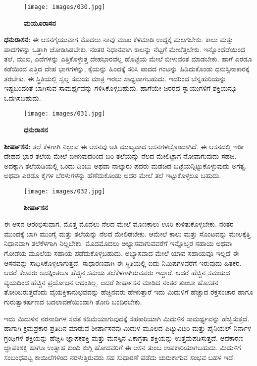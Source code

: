 \begin{figure}
\texttt{[image: images/030.jpg]}
\caption{ \textbf{ಮಯೂರಾಸನ} }
\end{figure}

\textbf{  ಧನುರಾಸನ:} ಈ ಆಸನಗೈಯುವಾಗ ಮೊದಲು ನಾವು ಮುಖ ಕೆಳಮಾಡಿ ಉದ್ದಕ್ಕೆ ಮಲಗಬೇಕು. ಕಾಲು ಮತ್ತು ಪಾದಗಳನ್ನು ಒತ್ತಾಗಿ ಜೋಡಿಸಿಡಬೇಕು. ನಂತರ ನಿಧಾನವಾಗಿ ಕಾಲನ್ನು ನೆಟ್ಟಗೆ ಮೇಲೆತ್ತಬೇಕು. ಇನ್ನೊಂದೆಡೆಯಿಂದ ತಲೆ, ಮುಖ, ಎದೆಗಳನ್ನು ಎತ್ತಿಕೊಳ್ಳುತ್ತ ದೇಹಭಾರವೆಲ್ಲ ಹೊಟ್ಟೆಯ ಮೇಲೆ ಬೀಳುವಂತೆ ಮಾಡಬೇಕು. ಹಾಗೆ ಎರಡೂ ಕಡೆಯಿಂದ ಎತ್ತಿದ ದೇಹ ಭಾಗಗಳನ್ನು, ಕೈಯನ್ನು ಹಿಂದಕ್ಕೆ ಸರಿಸಿ ಪಾದದ ಗಂಟನ್ನು ಹಿಡಿದುಕೊಂಡು ಧನುಸ್ಸಿನಾಕಾರಕ್ಕೆ ತರಬೇಕು. ಈ ಸ್ಥಿತಿಯಲ್ಲಿ ಸ್ವಲ್ಪ ಸಮಯ ಮಾತ್ರ ಇರಲು ಸಾಧ್ಯವಾಗಬಹುದು. ಇದರಿಂದ ಬೆನ್ನಹುರಿಯನ್ನು ಇಷ್ಟಬಂದಂತೆ ಬಾಗಿಸುವ ಸಾಮರ್ಥ್ಯವನ್ನು ಗಳಿಸಿಕೊಳ್ಳಬಹುದು. ಹಾಗೆಯೇ ಜಠರದ ಸ್ನಾಯುಗಳಿಗೆ ಶಕ್ತಿಯನ್ನೂ ಒದಗಿಸಬಹುದು.

\begin{figure}
\texttt{[image: images/031.jpg]}
\caption{ \textbf{ಧನುರಾಸನ} }
\end{figure}

\textbf{  ಶೀರ್ಷಾಸನ:} ತಲೆ ಕೆಳಗಾಗಿ ನಿಲ್ಲುವ ಈ ಆಸನವು ಅತಿ ಮುಖ್ಯವಾದ ಆಸನಗಳಲ್ಲೊಂದಾಗಿದೆ. ಈ ಆಸನದಲ್ಲಿ ಇಡೀ ದೇಹದ ಭಾರ ತಲೆಯ ಮೇಲೆ ಬೀಳುವುದರಿಂದ ಬರಿ ತಲೆಯನ್ನು ನೆಲದ ಮೇಲಿಟ್ಟಾಗ ನೋವಾಗುವುದು ಸಹಜ. ಅದಕ್ಕಾಗಿ ತಲೆಯಡಿಯಲ್ಲಿ ಒಂದು ದಿಂಬು ಅಥವಾ ನಾಲ್ಕಾರು ಪದರು ಮಡಚಿದ ಬಟ್ಟೆಯನ್ನಿಟ್ಟುಕೊಳ್ಳುವುದು ಅಗತ್ಯ. ಅಥವಾ ಎರಡೂ ಕೈಗಳ ಬೆರಳುಗಳನ್ನು ಹೆಣೆದುಕೊಂಡು ಅದರ ಮೇಲೆ ತಲೆ ಇಟ್ಟುಕೊಳ್ಳಲೂ ಬಹುದು.

\begin{figure}
\texttt{[image: images/032.jpg]}
\caption{ \textbf{ಶೀರ್ಷಾಸನ} }
\end{figure}

ಈ ಆಸನ ಆರಂಭಿಸುವಾಗ, ಮೊತ್ತ ಮೊದಲು ನೆಲದ ಮೇಲೆ ಮೊಣಕಾಲು ಊರಿ ಕುಳಿತುಕೊಳ್ಳಬೇಕು. ನಂತರ ಮುಂದಕ್ಕೆ ಬಾಗಿ ಮುಂಗೈ ಮತ್ತು ತಲೆಯನ್ನು ನೆಲದ ಮೇಲಿಡಬೇಕು. ಆಮೇಲೆ ಕಾಲು ಮತ್ತು ಸೊಂಟವನ್ನು ಮೇಲಕ್ಕೆತ್ತಿ ನಿಧಾನವಾಗಿ ತಲೆಕೆಳಗಾಗಿ ನಿಲ್ಲಬೇಕು. ಮೊದಮೊದಲು ಅಭ್ಯಾಸವಾಗುವವರೆಗೆ ಇನ್ನೊಬ್ಬರ ಸಹಾಯ ಅಥವಾ ಗೋಡೆಯ ಮೂಲೆಯ ಸಹಾಯ ಪಡೆದುಕೊಳ್ಳಬಹುದು. ಅಭ್ಯಾಸವಾದ ಮೇಲೆ ಯಾವ ಸಹಾಯವೂ ಇಲ್ಲದೆ ಈ ಆಸನವನ್ನು ಸಾಧಿಸಿಕೊಳ್ಳಲಾಗುತ್ತದೆ. ಸಾಧಾರಣವಾಗಿ ಈ ಸ್ಥಿತಿಯಲ್ಲಿ ಐದು ನಿಮಿಷಗಳವರೆಗೆ ಇರುವುದು ಹಿತಕರ. ಆದರೆ ಕೆಲವರು ಅದಕ್ಕಿಂತಲೂ ಹೆಚ್ಚಿನ ಸಮಯ ತಲೆಕೆಳಗಾಗಿರುವವರು ಇದ್ದಾರೆ. ಆದರೆ ಹೆಚ್ಚಿನ ಸಮಯದ ವ್ಯಯದಿಂದ ಹೆಚ್ಚಿನ ಪ್ರಯೋಜನ ಆದಂತಿಲ್ಲ. ಆದರೆ ಶೀರ್ಷಾಸನ ಮಾಡಿದ ನಂತರ ತುಂಬಾ ಹೊಸತನ ತೋರಿಬರುತ್ತದೆಂದು ವೈಯಕ್ತಿಕಾನುಭವವನ್ನು ಹೆಚ್ಚಿನವರು ಹೇಳುತ್ತಾರೆ ಇದು ಮಿದುಳಿಗೆ ಹೆಚ್ಚಾದ ರಕ್ತಸಂಚಾರ ಹಾಗೂ ಗುರುತ್ವಾಕರ್ಷಣದ ಬದಲಾವಣೆಯಿಂದಾಗಿ ತೋರಿ ಬಂದಿರಬೇಕು.

ಇದು ಮಿದುಳಿನ ನರನಾಡಿಗಳ ಸವೆತ ಕಡಿಮೆಯಾಗುವುದಕ್ಕೆ ಸಹಕಾರಿಯಾಗಿ ಮಿದುಳಿನ ಸಾಮರ್ಥ್ಯವನ್ನು ಹೆಚ್ಚಿಸುತ್ತದೆ. ಹಾಗಾಗಿ ಕ್ರಮಪ್ರಕಾರ ಪ್ರತಿದಿನ ಮಾಡುವ ಶೀರ್ಷಾಸನವು ಮಿದುಳ ಮೂಲದ ಪಿಟ್ಯುವಿಟರಿ ಮತ್ತು ಪೈನಿಯಲ್ ನಿರ್ನಾಳ ಗ್ರಂಥಿಗಳ ಶಕ್ತಿಯನ್ನು ಹೆಚ್ಚಿಸಿ ಜ್ಞಾಪಕಶಕ್ತಿ ಮತ್ತು ಮನಸ್ಸಿನ ಏಕಾಗ್ರತಾ ಶಕ್ತಿಯನ್ನು ಉತ್ತಮಪಡಿಸುತ್ತದೆ. ಆದಕಾರಣ ಜ್ಞಾಪಕಶಕ್ತಿ ಹಾಗೂ ಉತ್ಸಾಹ ಕುಂದಿ ಕುಗ್ಗಿ ಹೋದವರಿಗೆ ಈ ಆಸನ ತುಂಬ ಉಪಕಾರಿಯಾಗಬಹುದು. ಮಿದುಳಿಗೆ ಸಂಬಂಧಪಟ್ಟ ಕಾಯಿಲೆಗಳಿಂದ ನರಳುತ್ತಿರುವರು ಸಹ ಸುಧಾರಣೆ ಪಡೆದು ಚುರುಕಾಗುವ ಸಂಭವ ಬಹಳ ಇದೆ.

